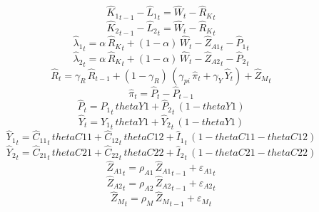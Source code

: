 \begin{dmath}
{{\hat{K}_{1}}}_{t-1}-{{\hat{L}_{1}}}_{t}={{\hat{W}}}_{t}-{{\hat{R}_{K}}}_{t}
\end{dmath}
\begin{dmath}
{{\hat{K}_{2}}}_{t-1}-{{\hat{L}_{2}}}_{t}={{\hat{W}}}_{t}-{{\hat{R}_{K}}}_{t}
\end{dmath}
\begin{dmath}
{{\hat{\lambda}_{1}}}_{t}={{\alpha}}\, {{\hat{R}_{K}}}_{t}+\left(1-{{\alpha}}\right)\, {{\hat{W}}}_{t}-{{\hat{Z}_{A1}}}_{t}-{{\hat{P}_{1}}}_{t}
\end{dmath}
\begin{dmath}
{{\hat{\lambda}_{2}}}_{t}={{\alpha}}\, {{\hat{R}_{K}}}_{t}+\left(1-{{\alpha}}\right)\, {{\hat{W}}}_{t}-{{\hat{Z}_{A2}}}_{t}-{{\hat{P}_{2}}}_{t}
\end{dmath}
\begin{dmath}
{{\hat{R}}}_{t}={{\gamma_{R}}}\, {{\hat{R}}}_{t-1}+\left(1-{{\gamma_{R}}}\right)\, \left({{\gamma_{pi}}}\, {{\hat{\pi}}}_{t}+{{\gamma_{Y}}}\, {{\hat{Y}}}_{t}\right)+{{\hat{Z}_M}}_{t}
\end{dmath}
\begin{dmath}
{{\hat{\pi}}}_{t}={{\hat{P}}}_{t}-{{\hat{P}}}_{t-1}
\end{dmath}
\begin{dmath}
{{\hat{P}}}_{t}={{\hat{P}_{1}}}_{t}\, {thetaY1}+{{\hat{P}_{2}}}_{t}\, \left(1-{thetaY1}\right)
\end{dmath}
\begin{dmath}
{{\hat{Y}}}_{t}={{\hat{Y}_{1}}}_{t}\, {thetaY1}+{{\hat{Y}_{2}}}_{t}\, \left(1-{thetaY1}\right)
\end{dmath}
\begin{dmath}
{{\hat{Y}_{1}}}_{t}={{\hat{C}_{1 1}}}_{t}\, {thetaC11}+{{\hat{C}_{1 2}}}_{t}\, {thetaC12}+{{\hat{I}_{1}}}_{t}\, \left(1-{thetaC11}-{thetaC12}\right)
\end{dmath}
\begin{dmath}
{{\hat{Y}_{2}}}_{t}={{\hat{C}_{2 1}}}_{t}\, {thetaC21}+{{\hat{C}_{2 2}}}_{t}\, {thetaC22}+{{\hat{I}_{2}}}_{t}\, \left(1-{thetaC21}-{thetaC22}\right)
\end{dmath}
\begin{dmath}
{{\hat{Z}_{A1}}}_{t}={{\rho_{A1}}}\, {{\hat{Z}_{A1}}}_{t-1}+{{\varepsilon_{A1}}}_{t}
\end{dmath}
\begin{dmath}
{{\hat{Z}_{A2}}}_{t}={{\rho_{A2}}}\, {{\hat{Z}_{A2}}}_{t-1}+{{\varepsilon_{A2}}}_{t}
\end{dmath}
\begin{dmath}
{{\hat{Z}_M}}_{t}={{\rho_{M}}}\, {{\hat{Z}_M}}_{t-1}+{{\varepsilon_{M}}}_{t}
\end{dmath}
